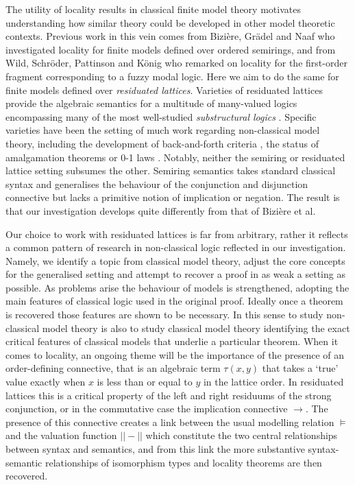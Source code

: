 \documentclass{lmcs} %
\newcommand{\?}{\ensuremath{\mkern0.4\thinmuskip}}
\begin{document}
The utility of locality results in classical finite model theory motivates understanding how similar theory could be developed in other model theoretic contexts. Previous work in this vein comes from Bizi\`{e}re, Gr\"{a}del and Naaf \cite{BiziereGradelNaaf23:Localitysemiring} who investigated locality for finite models defined over ordered semirings, and from Wild, Schr\"{o}der, Pattinson and K\"{o}nig \cite{WildSchroderPattinsonKonig18:fuzzyvanBenthem} who remarked on locality for the first-order fragment corresponding to a fuzzy modal logic. Here we aim to do the same for finite models defined over \textit{residuated lattices}. Varieties of residuated lattices provide the algebraic semantics for a multitude of many-valued logics encompassing many of the most well-studied \textit{substructural logics} \cite{GalatosJipsenKowalskiOno07:Resilattice}. Specific varieties have been the setting of much work regarding non-classical model theory, including the development of back-and-forth criteria \cite{DellundeGarciaNoguera18:Fuzzybackandforth}, the status of amalgamation theorems \cite{BadiaCostaDellunde19:Synccharfuzzy} or 0-1 laws \cite{BadiaCaicedoNoguera25:01law}. Notably, neither the semiring or residuated lattice setting subsumes the other. Semiring semantics takes standard classical syntax and generalises the behaviour of the conjunction and disjunction connective but lacks a primitive notion of implication or negation. The result is that our investigation develops quite differently from that of Bizi\`{e}re et al. 

Our choice to work with residuated lattices is far from arbitrary, rather it reflects a common pattern of research in non-classical logic reflected in our investigation. Namely, we identify a topic from classical model theory, adjust the core concepts for the generalised setting and attempt to recover a proof in as weak a setting as possible. As problems arise the behaviour of models is strengthened, adopting the main features of classical logic used in the original proof. Ideally once a theorem is recovered those features are shown to be necessary. In this sense to study non-classical model theory is also to study classical model theory identifying the exact critical features of classical models that underlie a particular theorem. When it comes to locality, an ongoing theme will be the importance of the presence of an order-defining connective, that is an algebraic term $\tau(x,y)$ that takes a `true' value exactly when $x$ is less than or equal to $y$ in the lattice order. In residuated lattices this is a critical property of the left and right residuums of the strong conjunction, or in the commutative case the implication connective $\rightarrow$. The presence of this connective creates a link between the usual modelling relation $\models$ and the valuation function $||-||$ which constitute the two central relationships between syntax and semantics, and from this link the more substantive syntax-semantic relationships of isomorphism types and locality theorems are then recovered. 
\end{document}
